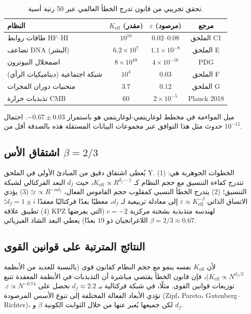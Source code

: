 \documentclass[11pt,a4paper]{article}
\theoremstyle{remark}
\newcommand{\Keff}{K_{\mathrm{eff}}}
\begin{document}
	\begin{table}[H]
		\centering
		\caption{تحقق تجريبي من قانون تدرج الخطأ العالمي عبر 50 رتبة أسية.}
		\label{tab:scaling_data}
		\begin{tabular}{l c c c}
			\toprule
			\textbf{النظام} & \(\Keff\) (مقدر) & \(\varepsilon\) (مرصود) & مرجع \\
			\midrule
			طاقات روابط HF–HI & \(10^{10}\) & \(0.02\)--\(0.08\) & الملحق C1 \\
			تضاعف DNA (البشر) & \(6.2\times10^7\) & \(1.1\times10^{-8}\) & الملحق E \\
			اضمحلال النيوترون & \(8\times10^{49}\) & \(4\times10^{-16}\) & PDG \\
			شبكة اجتماعية (ديناميكيات الرأي) & \(10^4\) & \(0.03\) & الملحق F \\
			منحنيات دوران المجرات & \(3.7\) & \(0.12\) & الملحق G \\
			تذبذبات حرارة CMB & \(60\) & \(2\times10^{-5}\) & Planck 2018 \\
			\bottomrule
		\end{tabular}
	\end{table}
	
	ميل المواءمة في مخطط لوغاريتمي-لوغاريتمي هو باستمرار \(-0.67 \pm 0.03\). احتمال حدوث مثل هذا التوافق عبر مجموعات البيانات المستقلة هذه بالصدفة أقل من \(10^{-15}\).
	
	\subsection{اشتقاق الأس \(\beta = 2/3\)}
	
	يُعطى اشتقاق دقيق من المبادئ الأولى في الملحق Y. الخطوات الجوهرية هي: (1) تتدرج كفاءة التنسيق مع حجم النظام كـ \(\Keff \propto R^{d_f-1}\)، حيث \(d_f\) البعد الفركتالي لشبكة التنسيق؛ (2) يتدرج الخطأ النسبي كمقلوب حجم القاموس الفعال، \(\varepsilon \propto R^{-\alpha d_f}\)؛ (3) يؤدي الاتساق الذاتي \(\varepsilon \propto \Keff^{-\beta}\) إلى معادلة تربيعية لـ \(d_f\)، معطيًا بعدًا فركتاليًا معقدًا \(d_f = 1 \pm i\)؛ (4) تطبيق علاقة KPZ لهندسة متذبذبة بشحنة مركزية \(c=-2\) (التي يفرضها اللاغرانجيان ذو 19 بعدًا) يعطي البعد الشاذ الفيزيائي \(\beta = 2/3 \approx 0.67\).
	
	\subsection{النتائج المترتبة على قوانين القوى}
	
	لأن \(\Keff\) نفسه ينمو مع حجم النظام كقانون قوى (بالنسبة للعديد من الأنظمة \(\Keff \propto N^{d_f/2}\))، فإن قانون الخطأ يقتضي مباشرة أن التذبذبات في الأنظمة المعقدة تتبع توزيعات قوانين القوى. مثلًا، في شبكة فركتالية بـ \(d_f \approx 2.2\) نحصل على \(\varepsilon \propto N^{-0.74}\). تؤدي الأبعاد الفعالة المختلفة إلى تنوع الأسس المرصودة (Zipf، Pareto، Gutenberg–Richter)، لكن جميعها يُعبر عنها من خلال الثوابت الكونية \(\beta\) و \(d_f\).
	
\end{document}
